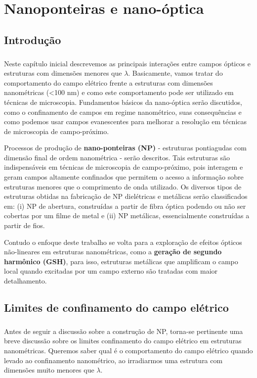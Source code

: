 \chapter{Nanoponteiras e nano-óptica}

\section{Introdução}
\paragraph{}
Neste capítulo inicial descrevemos as principais interações entre campos ópticos e estruturas com dimensões menores que $\lambda$. Basicamente, vamos tratar do comportamento do campo elétrico frente a estruturas com dimensões nanométricas (<100 nm) e como este comportamento pode ser utilizado em técnicas de microscopia.  Fundamentos básicos da nano-óptica serão discutidos, como o confinamento de campos em regime nanométrico, suas consequências e como podemos usar campos evanescentes para melhorar a resolução em técnicas de microscopia de campo-próximo.
 
Processos de produção de \textbf{nano-ponteiras (NP)} - estruturas pontiagudas com dimensão final de ordem nanométrica - serão descritos. Tais estruturas são indispensáveis em técnicas de microscopia de campo-próximo, pois interagem e geram campos altamente confinados que permitem o acesso a informação sobre estruturas menores que o comprimento de onda utilizado. Os diversos tipos de estruturas obtidas na fabricação de NP dielétricas e metálicas serão classificados em: (i) NP de abertura, construídas a partir de fibra óptica podendo ou não ser cobertas por um filme de metal e (ii) NP metálicas, essencialmente construídas a partir de fios.

Contudo o enfoque deste trabalho se volta para a exploração de efeitos ópticos não-lineares em estruturas nanométricas, como a \textbf{geração de segundo harmônico (GSH)}, para isso, estruturas metálicas que amplificam o campo local quando excitadas por um campo externo são tratadas com maior detalhamento.

\section{Limites de confinamento do campo elétrico}
\paragraph{}
Antes de seguir a discussão sobre a construção de NP, torna-se pertinente uma breve discussão sobre os limites confinamento do campo elétrico em estruturas nanométricas. Queremos saber qual é o comportamento do campo elétrico quando levado ao confinamento nanométrico, ao irradiarmos uma estrutura com dimensões muito menores que $\lambda$.

